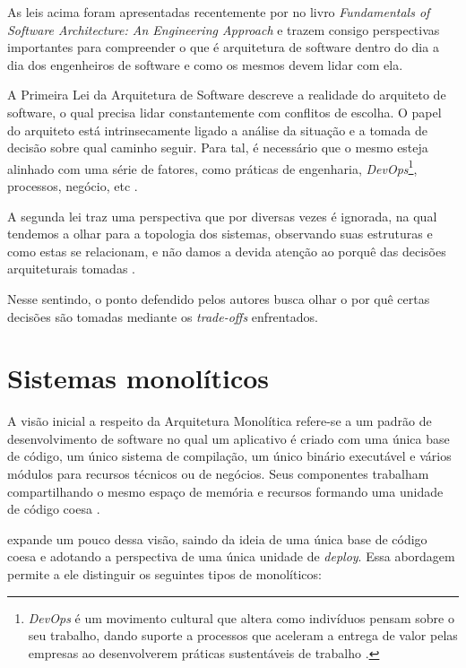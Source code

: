 As leis acima foram apresentadas recentemente por 
no livro \textit{Fundamentals of Software Architecture: An Engineering Approach} e trazem consigo
perspectivas importantes para compreender o que é arquitetura de software dentro do dia a dia dos
engenheiros de software e como os mesmos devem lidar com ela.

A Primeira Lei da Arquitetura de Software descreve a realidade do arquiteto de
software, o qual precisa lidar constantemente com conflitos de escolha. O papel do arquiteto está
intrinsecamente ligado a análise da situação e a tomada de decisão sobre qual caminho seguir. Para
tal, é necessário que o mesmo esteja alinhado com uma série de fatores, como práticas de engenharia,
\textit{DevOps}\footnote{\textit{DevOps} é um movimento cultural que altera como indivíduos pensam
sobre o seu trabalho, dando suporte a processos que aceleram a entrega de valor pelas empresas ao
desenvolverem práticas sustentáveis de trabalho \cite{davis2016effective}.}, processos, negócio, etc
\cite{Richards2020:FundamentalsOfSoftwareArchitecture}.

A segunda lei traz uma perspectiva que por diversas vezes é ignorada, na qual tendemos a olhar para
a topologia dos sistemas, observando suas estruturas e como estas se relacionam, e não damos a devida
atenção ao porquê das decisões arquiteturais tomadas \cite{Richards2020:FundamentalsOfSoftwareArchitecture}.

Nesse sentindo, o ponto defendido pelos autores busca olhar o por quê certas decisões são
tomadas mediante os \textit{trade-offs} enfrentados.

\section{Sistemas monolíticos}
\label{monolithics}

A visão inicial a respeito da Arquitetura Monolítica refere-se a um padrão de desenvolvimento
de software no qual um aplicativo é criado com uma única base de código, um único sistema de compilação,
um único binário executável e vários módulos para recursos técnicos ou de negócios. Seus componentes
trabalham compartilhando o mesmo espaço de memória e recursos formando uma unidade de
código coesa \cite{NatalliaSakovich}.

 expande um pouco dessa visão, saindo da ideia de uma única base
de código coesa e adotando a perspectiva de uma única unidade de \textit{deploy}. Essa abordagem
permite a ele distinguir os seguintes tipos de monolíticos:

